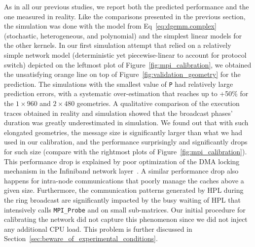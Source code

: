         As in all our previous studies, we report both the predicted performance and the one measured in reality. Like
        the comparisons presented in the previous section, the simulation was done with the \dgemm model from
        Eq~\eqref{eq:dgemm.complex} (stochastic, heterogeneous, and polynomial) and the simplest linear models for the
        other kernels.  In our first simulation attempt that relied on a relatively simple network model (deterministic
        yet piecewise-linear to account for protocol switch) depicted on the leftmost plot of
        Figure~\ref{fig:mpi_calibration}, we obtained the unsatisfying orange line on top of
        Figure~\ref{fig:validation_geometry} for the prediction.  The simulations with the smallest value of \texttt{P}
        had relatively large prediction errors, with a systematic over-estimation that reaches up to +50\% for the
        \(1\times960\) and \(2\times480\) geometries.  A qualitative comparison of the execution traces obtained in
        reality and simulation showed that the broadcast phases' duration was greatly underestimated in simulation. We
        found out that with such elongated geometries, the message size is significantly larger than what we had used in
        our calibration, and the performance surprisingly and significantly drops for such size (compare with the
        rightmost plots of Figure~\ref{fig:mpi_calibration}). This performance drop is explained by poor optimization of
        the DMA locking mechanism in the Infiniband network layer~\cite{denis:inria-00586015}. A similar performance drop
        also happens for intra-node communications that poorly manage the caches above a given size. Furthermore, the
        communication patterns generated by HPL during the ring broadcast are significantly impacted by the busy waiting
        of HPL that intensively calls \texttt{MPI\_Probe} and \dgemm on small sub-matrices. Our initial
        procedure for calibrating the network did not capture this phenomenon since we did not inject any additional CPU
        load. This problem is further discussed in Section~\ref{sec:beware_of_experimental_conditions}.

